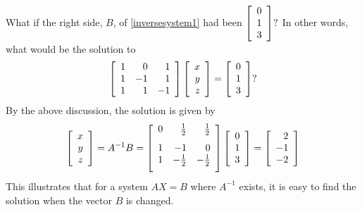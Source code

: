 What if the right side, $B$,  of \ref{inversesystem1} had been $\left[
\begin{array}{r}
0 \\
1 \\
3
\end{array}
\right] ?$ In other words, what would be the solution to
\begin{equation*}
\left[
\begin{array}{rrr}
1 & 0 & 1 \\
1 & -1 & 1 \\
1 & 1 & -1
\end{array}
\right] \left[
\begin{array}{r}
x \\
y \\
z
\end{array}
\right] =\left[
\begin{array}{r}
0 \\
1 \\
3
\end{array}
\right] ?
\end{equation*}
By the above discussion, the solution is given by 
\begin{equation*}
\leftB
\begin{array}{r}
x \\
y \\
z
\end{array}
\rightB = A^{-1}B = \leftB
\begin{array}{rrr}
0 & \vspace{0.05in}\frac{1}{2} & \vspace{0.05in}\frac{1}{2} \\
1 & -1 & 0 \\
1 & -\vspace{0.05in}\frac{1}{2} & -\vspace{0.05in}\frac{1}{2}
\end{array}
\rightB \leftB
\begin{array}{r}
0 \\
1 \\
3
\end{array}
\rightB =\leftB
\begin{array}{r}
2 \\
-1 \\
-2
\end{array}
\rightB 
\end{equation*}
This illustrates that for a system $AX=B$ where $A^{-1}$ exists, 
it is easy to find the solution when the vector $B$ is changed.
%
